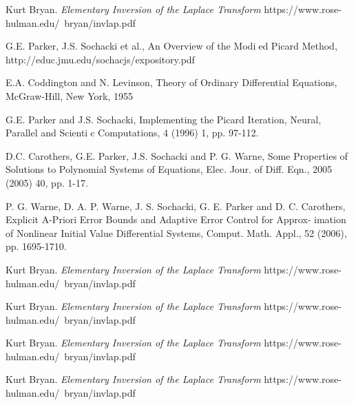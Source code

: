 \begin{thebibliography}{99}
 Kurt Bryan. {\it Elementary Inversion of the Laplace Transform} https://www.rose-hulman.edu/~bryan/invlap.pdf

 G.E. Parker, J.S. Sochacki et al., An Overview of the Modied Picard
Method, http://educ.jmu.edu/sochacjs/expository.pdf

 E.A. Coddington and N. Levinson, Theory of Ordinary Differential Equations, McGraw-Hill, New York, 1955

 G.E. Parker and J.S. Sochacki, Implementing the Picard Iteration, Neural, Parallel and Scientic Computations, 4 (1996) 1, pp. 97-112.

 D.C. Carothers, G.E. Parker, J.S. Sochacki and P. G. Warne, Some
Properties of Solutions to Polynomial Systems of Equations, Elec. Jour. of Diff. Eqn.,
2005 (2005) 40, pp. 1-17.

 P. G. Warne, D. A. P. Warne, J. S. Sochacki, G. E. Parker and D. C.
Carothers, Explicit A-Priori Error Bounds and Adaptive Error Control for Approx-
imation of Nonlinear Initial Value Differential Systems, Comput. Math. Appl., 52
(2006), pp. 1695-1710.

 Kurt Bryan. {\it Elementary Inversion of the Laplace Transform} https://www.rose-hulman.edu/~bryan/invlap.pdf

 Kurt Bryan. {\it Elementary Inversion of the Laplace Transform} https://www.rose-hulman.edu/~bryan/invlap.pdf

 Kurt Bryan. {\it Elementary Inversion of the Laplace Transform} https://www.rose-hulman.edu/~bryan/invlap.pdf

 Kurt Bryan. {\it Elementary Inversion of the Laplace Transform} https://www.rose-hulman.edu/~bryan/invlap.pdf

\end{thebibliography}